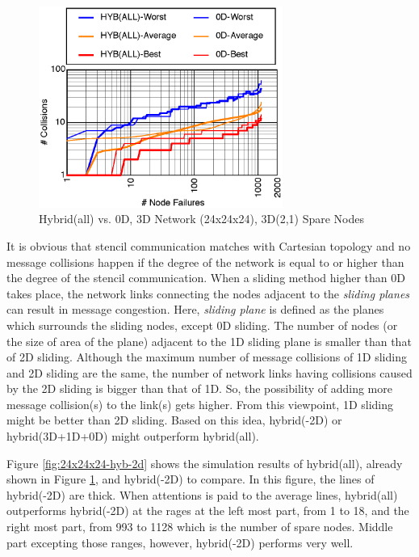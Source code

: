 \documentclass[Afour,times,sageh]{sagej}
\begin{document}
\begin{figure}[ht]
\centering
\includegraphics[width=80mm]{Figs/24x24x24-CL.eps}
  \caption{Hybrid(all) vs. 0D, 3D Network (24x24x24), 3D(2,1)
    Spare Nodes}
  \label{fig:24x24x24}
\end{figure}

It is obvious that stencil communication matches with Cartesian
topology and no message collisions happen if the degree of the network
is equal to or higher than the
degree of the stencil communication. When a sliding method higher than
0D takes place, the network links connecting the nodes adjacent to the
{\it sliding planes} can result in message congestion. Here, {\it
  sliding plane} is defined as the planes which surrounds the sliding
nodes, except 0D sliding. The number of nodes (or the size of area of
the plane) adjacent to the 1D sliding plane is smaller than that of 2D
sliding. Although the maximum number of message collisions of 1D
sliding and 2D sliding are the same, the number of network links
having collisions caused by the 2D sliding is bigger than that of
1D. So, the possibility of adding more message collision(s) to the
link(s) gets higher. From this viewpoint, 1D sliding might be better
than 2D sliding. Based on this idea, hybrid(-2D) or hybrid(3D+1D+0D)
might outperform hybrid(all).

Figure \ref{fig:24x24x24-hyb-2d} shows the simulation results of
hybrid(all), already shown in Figure \ref{fig:24x24x24}, and
hybrid(-2D) to compare. In this figure, the lines of hybrid(-2D)
are thick. When attentions is paid to the average lines, hybrid(all)
outperforms hybrid(-2D) at the rages at the left most part, from 1 to
18, and the right most part, from 993 to 1128 which is the number of
spare nodes. Middle part excepting those ranges, however, hybrid(-2D)
performs very well.
\end{document}
